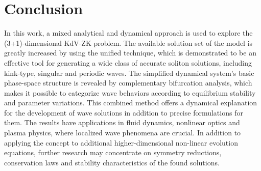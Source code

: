 \documentclass[10pt]{NSP1}
\numberwithin{equation}{section}
\begin{document}
\section{Conclusion}\label{s5}
\noindent In this work, a mixed analytical and dynamical approach is used to explore the (3+1)-dimensional KdV-ZK problem. The available solution set of the model is greatly increased by using the unified technique, which is demonstrated to be an effective tool for generating a wide class of accurate soliton solutions, including kink-type, singular and periodic waves. The simplified dynamical system's basic phase-space structure is revealed by complementary bifurcation analysis, which makes it possible to categorize wave behaviors according to equilibrium stability and parameter variations. This combined method offers a dynamical explanation for the development of wave solutions in addition to precise formulations for them. The results have applications in fluid dynamics, nonlinear optics and plasma physics, where localized wave phenomena are crucial. In addition to applying the concept to additional higher-dimensional non-linear evolution equations, further research may concentrate on symmetry reductions, conservation laws and stability characteristics of the found solutions.
\end{document}
